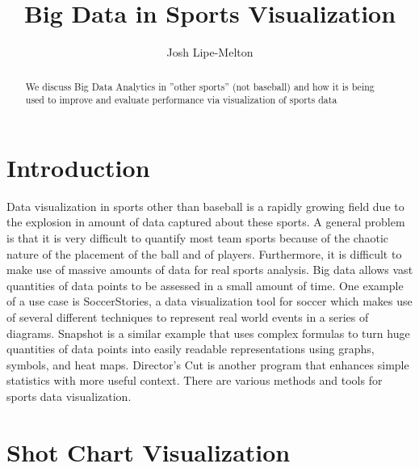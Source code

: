 \documentclass[sigconf]{acmart}
\begin{document}
\title{Big Data in Sports Visualization}


\author{Josh Lipe-Melton}

\renewcommand{\shortauthors}{J. Lipe-Melton}


\begin{abstract}
We discuss Big Data Analytics in ''other sports'' (not baseball) and how it is being used to improve and evaluate performance via visualization of sports data
\end{abstract}



\maketitle




\section{Introduction} 

Data visualization in sports other than baseball is a rapidly growing field due to the explosion in amount of data captured about these sports. A general problem is that it is very difficult to quantify most team sports because of the chaotic nature of the placement of the ball and of players. Furthermore, it is difficult to make use of massive amounts of data for real sports analysis. Big data allows vast quantities of data points to be assessed in a small amount of time. One example of a use case is SoccerStories, a data visualization tool for soccer which makes use of several different techniques to represent real world events in a series of diagrams. Snapshot is a similar example that uses complex formulas to turn huge quantities of data points into easily readable representations using graphs, symbols, and heat maps. Director’s Cut is another program that enhances simple statistics with more useful context. There are various methods and tools for sports data visualization.

\section{Shot Chart Visualization}
\end{document}
